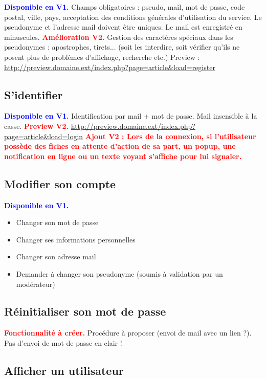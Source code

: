 \documentclass[a4paper,10pt]{article}
\newcommand\existant[1]{\noindent\textbf{\textcolor{blue}{#1}}}
\newcommand\desire[1]{\noindent\textbf{\textcolor{red}{#1}}}
\begin{document}
\existant{Disponible en V1.} Champs obligatoires : pseudo, mail, mot de passe, code postal, ville, pays, acceptation des conditions générales d'utilisation du service. Le pseudonyme et l'adresse mail doivent être uniques. Le mail est enregistré en minuscules. 
\desire{Amélioration V2.} Gestion des caractères spéciaux dans les pseudonymes : apostrophes, tirets... (soit les interdire, soit vérifier qu'ils ne posent plus de problèmes d'affichage, recherche etc.) Preview : \url{http://preview.domaine.ext/index.php?page=article&load=register}

\subsection{S'identifier}

\existant{Disponible en V1.} Identification par mail + mot de passe. Mail insensible à la casse.
\desire{Preview V2.} \url{http://preview.domaine.ext/index.php?page=article&load=login}
\desire{Ajout V2 : Lors de la connexion, si l'utilisateur possède des fiches en attente d'action de sa part, un popup, une notification en ligne ou un texte voyant s'affiche pour lui signaler.}

\subsection{Modifier son compte}

\existant{Disponible en V1.}
\begin{itemize}
\item Changer son mot de passe
\item Changer ses informations personnelles 
\item Changer son adresse mail
\item Demander à changer son pseudonyme (soumis à validation par un modérateur)
\end{itemize}

\subsection{Réinitialiser son mot de passe}
\desire{Fonctionnalité à créer.} Procédure à proposer (envoi de mail avec un lien ?). Pas d'envoi de mot de passe en clair !

\subsection{Afficher un utilisateur}
\end{document}
